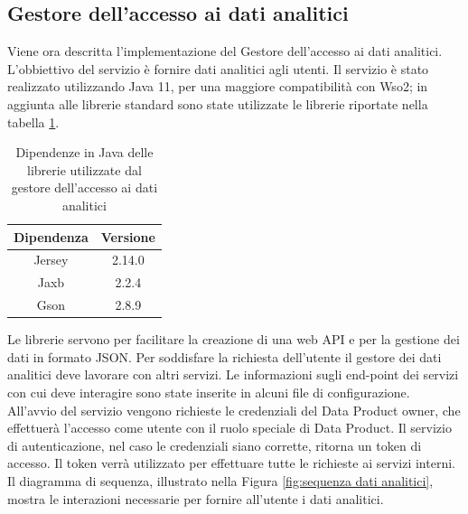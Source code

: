 \documentclass[12pt]{report}
\begin{document}
\subsection{Gestore dell'accesso ai dati analitici}
Viene ora descritta l'implementazione del Gestore dell'accesso ai dati analitici.
L'obbiettivo del servizio è fornire dati analitici agli utenti.
Il servizio è stato realizzato utilizzando Java 11, per una maggiore compatibilità con Wso2; in aggiunta alle librerie standard sono state utilizzate le librerie riportate nella tabella \ref{tab:dependencies}.
\begin{table}[H]
\centering
\begin{tabular}{|c|c|}
    \hline
    Dipendenza & Versione \\
    \hline
    Jersey & 2.14.0 \\
    Jaxb & 2.2.4 \\
    Gson & 2.8.9 \\
    \hline
\end{tabular}
\caption{Dipendenze in Java delle librerie utilizzate dal gestore dell'accesso ai dati analitici}
\label{tab:dependencies}
\end{table}
Le librerie servono per facilitare la creazione di una web API e per la gestione dei dati in formato JSON.
Per soddisfare la richiesta dell'utente il gestore dei dati analitici deve lavorare con altri servizi.
Le informazioni sugli end-point dei servizi con cui deve interagire sono state inserite in alcuni file di configurazione.
All'avvio del servizio vengono richieste le credenziali del Data Product owner, che effettuerà l'accesso come utente con il ruolo speciale di Data Product.
Il servizio di autenticazione, nel caso le credenziali siano corrette, ritorna un token di accesso.
Il token verrà utilizzato per effettuare tutte le richieste ai servizi interni.
Il diagramma di sequenza, illustrato nella Figura \ref{fig:sequenza dati analitici}, mostra le interazioni necessarie per fornire all'utente i dati analitici.
\end{document}
